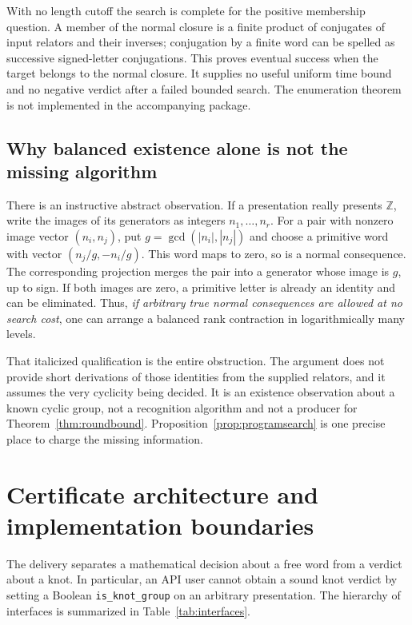 \documentclass[11pt,letterpaper]{article}
\theoremstyle{definition}
\newcommand{\Z}{\mathbb Z}
\begin{document}
With no length cutoff the search is complete for the positive membership
question. A member of the normal closure is a finite product of conjugates
of input relators and their inverses; conjugation by a finite word can be
spelled as successive signed-letter conjugations. This proves eventual
success when the target belongs to the normal closure. It supplies no useful
uniform time bound and no negative verdict after a failed bounded search.
The enumeration theorem is not implemented in the accompanying package.

\subsection{Why balanced existence alone is not the missing algorithm}
There is an instructive abstract observation. If a presentation really
presents $\Z$, write the images of its generators as integers
$n_1,\ldots,n_r$. For a pair with nonzero image vector $(n_i,n_j)$, put
$g=\gcd(|n_i|,|n_j|)$ and choose a primitive word with vector
$(n_j/g,-n_i/g)$. This word maps to zero, so is a normal consequence.
The corresponding projection merges the pair into a generator whose image
is $g$, up to sign. If both images are zero, a primitive letter is already
an identity and can be eliminated. Thus, \emph{if arbitrary true normal
consequences are allowed at no search cost}, one can arrange a balanced
rank contraction in logarithmically many levels.

That italicized qualification is the entire obstruction. The argument does
not provide short derivations of those identities from the supplied relators,
and it assumes the very cyclicity being decided. It is an existence
observation about a known cyclic group, not a recognition algorithm and not
a producer for Theorem~\ref{thm:roundbound}. Proposition~\ref{prop:programsearch}
is one precise place to charge the missing information.

\section{Certificate architecture and implementation boundaries}
\label{sec:implementation}
The delivery separates a mathematical decision about a free word from a
verdict about a knot. In particular, an API user cannot obtain a sound knot
verdict by setting a Boolean \texttt{is\_knot\_group} on an arbitrary
presentation. The hierarchy of interfaces is summarized in
Table~\ref{tab:interfaces}.
\end{document}
